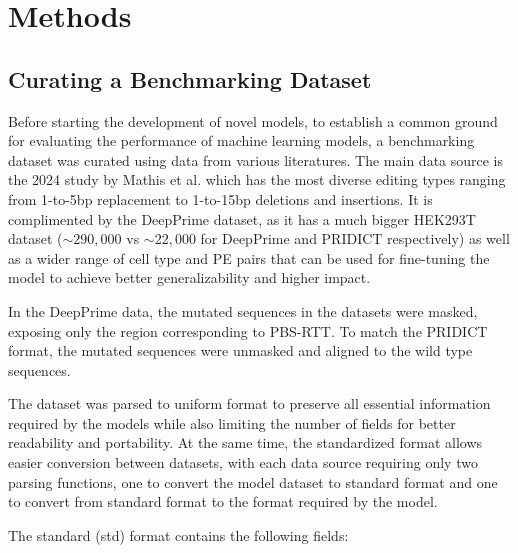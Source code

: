 \chapter{Methods}

\minitoc

\section{Curating a Benchmarking Dataset}

Before starting the development of novel models, to establish a common ground for evaluating the performance of machine learning models, a benchmarking dataset was curated using data from various literatures. The main data source is the 2024 study by Mathis et al. which has the most diverse editing types ranging from 1-to-5bp replacement to 1-to-15bp deletions and insertions\cite{mathisMachineLearningPrediction2024}. It is complimented by the DeepPrime dataset, as it has a much bigger HEK293T dataset ($\sim290,000$ vs $\sim22,000$ for DeepPrime and PRIDICT respectively) as well as a wider range of cell type and PE pairs that can be used for fine-tuning the model to achieve better generalizability and higher impact\cite{yuPredictionEfficienciesDiverse2023}. 

In the DeepPrime data, the mutated sequences in the datasets were masked, exposing only the region corresponding to PBS-RTT. To match the PRIDICT format, the mutated sequences were unmasked and aligned to the wild type sequences. 

The dataset was parsed to uniform format to preserve all essential information required by the models while also limiting the number of fields for better readability and portability. At the same time, the standardized format allows easier conversion between datasets, with each data source requiring only two parsing functions, one to convert the model dataset to standard format and one to convert from standard format to the format required by the model. 

The standard (std) format contains the following fields:

